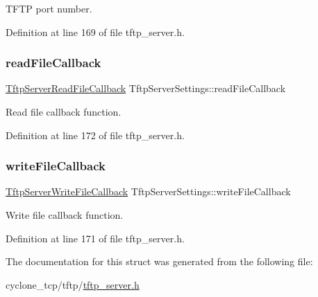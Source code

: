 T\+F\+TP port number. 



Definition at line 169 of file tftp\+\_\+server.\+h.

\mbox{\label{structTftpServerSettings_a19916ed7790a89b5faac2c3f70cd5600}} 
\subsubsection{\texorpdfstring{read\+File\+Callback}{readFileCallback}}
{\footnotesize\ttfamily \hyperlink{tftp__server_8h_afa6bd838b7892c537a693b49fd742435}{Tftp\+Server\+Read\+File\+Callback} Tftp\+Server\+Settings\+::read\+File\+Callback}



Read file callback function. 



Definition at line 172 of file tftp\+\_\+server.\+h.

\mbox{\label{structTftpServerSettings_a26573cbdb9c307f46dec55de70ff7843}} 
\subsubsection{\texorpdfstring{write\+File\+Callback}{writeFileCallback}}
{\footnotesize\ttfamily \hyperlink{tftp__server_8h_ac3b6ec08b80dc8f9c1bc753d3541b613}{Tftp\+Server\+Write\+File\+Callback} Tftp\+Server\+Settings\+::write\+File\+Callback}



Write file callback function. 



Definition at line 171 of file tftp\+\_\+server.\+h.



The documentation for this struct was generated from the following file\+:\begin{DoxyCompactItemize}
\item 
cyclone\+\_\+tcp/tftp/\hyperlink{tftp__server_8h}{tftp\+\_\+server.\+h}\end{DoxyCompactItemize}
